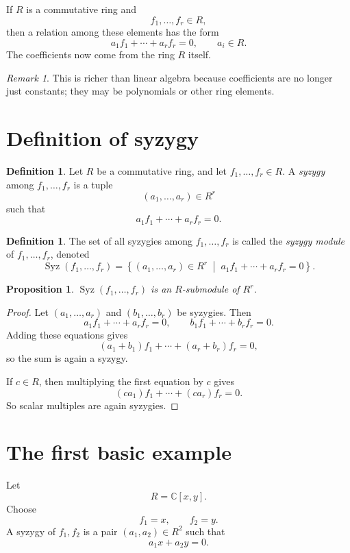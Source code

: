 \documentclass[11pt]{article}
\newtheorem{proposition}[theorem]{Proposition}
\theoremstyle{definition}
\newtheorem{definition}[theorem]{Definition}
\theoremstyle{remark}
\newtheorem{remark}[theorem]{Remark}
\newcommand{\C}{\mathbb{C}}
\newcommand{\Syz}{\operatorname{Syz}}
\begin{document}
	If \(R\) is a commutative ring and
	\[
	f_1,\dots,f_r\in R,
	\]
	then a relation among these elements has the form
	\[
	a_1f_1+\cdots+a_rf_r=0,
	\qquad a_i\in R.
	\]
	The coefficients now come from the ring \(R\) itself.
	
	\begin{remark}
		This is richer than linear algebra because coefficients are no longer just constants; they may be polynomials or other ring elements.
	\end{remark}
	
	\section{Definition of syzygy}
	
	\begin{definition}
		Let \(R\) be a commutative ring, and let \(f_1,\dots,f_r\in R\).
		A \emph{syzygy} among \(f_1,\dots,f_r\) is a tuple
		\[
		(a_1,\dots,a_r)\in R^r
		\]
		such that
		\[
		a_1f_1+\cdots+a_rf_r=0.
		\]
	\end{definition}
	
	\begin{definition}
		The set of all syzygies among \(f_1,\dots,f_r\) is called the \emph{syzygy module} of \(f_1,\dots,f_r\), denoted
		\[
		\Syz(f_1,\dots,f_r)
		=
		\left\{
		(a_1,\dots,a_r)\in R^r \;\middle|\; a_1f_1+\cdots+a_rf_r=0
		\right\}.
		\]
	\end{definition}
	
	\begin{proposition}
		\(\Syz(f_1,\dots,f_r)\) is an \(R\)-submodule of \(R^r\).
	\end{proposition}
	
	\begin{proof}
		Let \((a_1,\dots,a_r)\) and \((b_1,\dots,b_r)\) be syzygies. Then
		\[
		a_1f_1+\cdots+a_rf_r=0,
		\qquad
		b_1f_1+\cdots+b_rf_r=0.
		\]
		Adding these equations gives
		\[
		(a_1+b_1)f_1+\cdots+(a_r+b_r)f_r=0,
		\]
		so the sum is again a syzygy.
		
		If \(c\in R\), then multiplying the first equation by \(c\) gives
		\[
		(ca_1)f_1+\cdots+(ca_r)f_r=0.
		\]
		So scalar multiples are again syzygies.
	\end{proof}
	
	\section{The first basic example}
	
	Let
	\[
	R=\C[x,y].
	\]
	Choose
	\[
	f_1=x,\qquad f_2=y.
	\]
	A syzygy of \(f_1,f_2\) is a pair \((a_1,a_2)\in R^2\) such that
	\[
	a_1x+a_2y=0.
	\]
	
\end{document}
